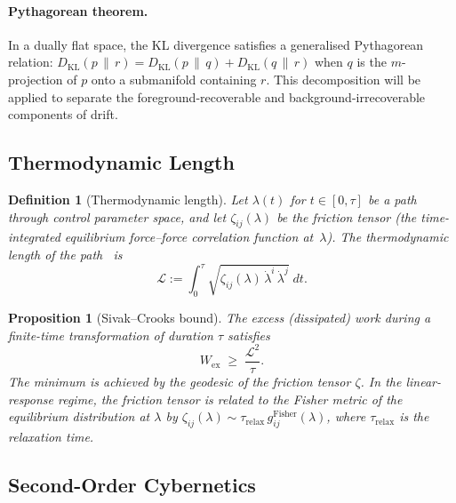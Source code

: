 \documentclass[12pt]{article}
\newtheorem{proposition}[theorem]{Proposition}
\newtheorem{definition}[theorem]{Definition}
\begin{document}
\paragraph{Pythagorean theorem.}
In a dually flat space, the KL divergence satisfies
a generalised Pythagorean relation:
$D_{\mathrm{KL}}(p\,\|\,r)
= D_{\mathrm{KL}}(p\,\|\,q)
+ D_{\mathrm{KL}}(q\,\|\,r)$
when $q$ is the $m$-projection of $p$ onto a
submanifold containing $r$.
This decomposition will be applied to separate the
foreground-recoverable and background-irrecoverable
components of drift.

\subsection{Thermodynamic Length}
\label{subsec:thermo_length}

\begin{definition}[Thermodynamic length]
\label{def:thermo_length}
Let $\lambda(t)$ for $t \in [0,\tau]$ be a path through
control parameter space, and let $\zeta_{ij}(\lambda)$ be the
\emph{friction tensor} (the time-integrated equilibrium
force--force correlation function at~$\lambda$).
The \emph{thermodynamic length} of the
path~\cite{Crooks2007} is
\begin{equation}
\label{eq:thermo_length}
\mathcal{L}
:= \int_0^\tau
\sqrt{\zeta_{ij}(\lambda)\,
  \dot{\lambda}^i\,\dot{\lambda}^j}\;dt.
\end{equation}
\end{definition}

\begin{proposition}[Sivak--Crooks bound]
\label{prop:sivak_crooks}
The excess (dissipated) work during a finite-time
transformation of duration $\tau$ satisfies~\cite{SivakCrooks2012}
\begin{equation}
\label{eq:sivak_crooks}
W_{\mathrm{ex}} \;\geq\; \frac{\mathcal{L}^2}{\tau}.
\end{equation}
The minimum is achieved by the geodesic of the friction
tensor $\zeta$.
In the linear-response regime, the friction tensor is
related to the Fisher metric of the equilibrium distribution
at $\lambda$ by
$\zeta_{ij}(\lambda)
\sim \tau_{\mathrm{relax}}\,g_{ij}^{\mathrm{Fisher}}(\lambda)$,
where $\tau_{\mathrm{relax}}$ is the relaxation time.
\end{proposition}

\subsection{Second-Order Cybernetics}
\label{subsec:cybernetics}
\end{document}
